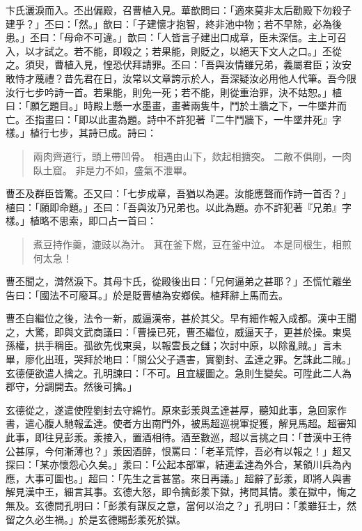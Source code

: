卞氏灑淚而入。丕出偏殿，召曹植入見。華歆問曰：「適來莫非太后勸殿下勿殺子建乎？」丕曰：「然。」歆曰：「子建懷才抱智，終非池中物；若不早除，必為後患。」丕曰：「母命不可違。」歆曰：「人皆言子建出口成章，臣未深信。主上可召入，以才試之。若不能，即殺之；若果能，則貶之，以絕天下文人之口。」丕從之。須臾，曹植入見，惶恐伏拜請罪。丕曰：「吾與汝情雖兄弟，義屬君臣；汝安敢恃才蔑禮？昔先君在日，汝常以文章誇示於人，吾深疑汝必用他人代筆。吾今限汝行七步吟詩一首。若果能，則免一死；若不能，則從重治罪，決不姑恕。」植曰：「願乞題目。」時殿上懸一水墨畫，畫著兩隻牛，鬥於土牆之下，一牛墜井而亡。丕指畫曰：「即以此畫為題。詩中不許犯著『二牛鬥牆下，一牛墜井死』字樣。」植行七步，其詩已成。詩曰：

\begin{quote}
兩肉齊道行，頭上帶凹骨。
相遇由山下，欻起相搪突。
二敵不俱剛，一肉臥土窟。
非是力不如，盛氣不泄畢。
\end{quote}

曹丕及群臣皆驚。丕又曰：「七步成章，吾猶以為遲。汝能應聲而作詩一首否？」植曰：「願即命題。」丕曰：「吾與汝乃兄弟也。以此為題。亦不許犯著『兄弟』字樣。」植略不思索，即口占一首曰：

\begin{quote}
煮豆持作羹，漉豉以為汁。
萁在釜下燃，豆在釜中泣。
本是同根生，相煎何太急！
\end{quote}

曹丕聞之，潸然淚下。其母卞氏，從殿後出曰：「兄何逼弟之甚耶？」丕慌忙離坐告曰：「國法不可廢耳。」於是貶曹植為安鄉侯。植拜辭上馬而去。

曹丕自繼位之後，法令一新，威逼漢帝，甚於其父。早有細作報入成都。漢中王聞之，大驚，即與文武商議曰：「曹操已死，曹丕繼位，威逼天子，更甚於操。東吳孫權，拱手稱臣。孤欲先伐東吳，以報雲長之讎；次討中原，以除亂賊。」言未畢，廖化出班，哭拜於地曰：「關公父子遇害，實劉封、孟達之罪。乞誅此二賊。」玄德便欲遣人擒之。孔明諫曰：「不可。且宜緩圖之。急則生變矣。可陞此二人為郡守，分調開去。然後可擒。」

玄德從之，遂遣使陞劉封去守綿竹。原來彭羕與孟達甚厚，聽知此事，急回家作書，遣心腹人馳報孟達。使者方出南門外，被馬超巡視軍捉獲，解見馬超。超審知此事，即往見彭羕。羕接入，置酒相待。酒至數巡，超以言挑之曰：「昔漢中王待公甚厚，今何漸薄也？」羕因酒醉，恨罵曰：「老革荒悖，吾必有以報之！」超又探曰：「某亦懷怨心久矣。」羕曰：「公起本部軍，結連孟達為外合，某領川兵為內應，大事可圖也。」超曰：「先生之言甚當。來日再議。」超辭了彭羕，即將人與書解見漢中王，細言其事。玄德大怒，即令擒彭羕下獄，拷問其情。羕在獄中，悔之無及。玄德問孔明曰：「彭羕有謀反之意，當何以治之？」孔明曰：「羕雖狂士，然留之久必生禍。」於是玄德賜彭羕死於獄。

